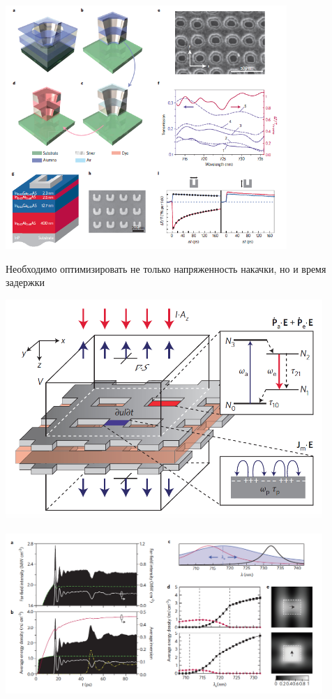 \documentclass[9pt, compress, xcolor=table]{beamer}
\begin{document}
\begin{frame}{}
\begin{center}
\includegraphics[width=0.8\textwidth]{am2}
\end{center}
Необходимо оптимизировать не только напряженность накачки, но и время задержки 

\end{frame}

\begin{frame}{}
\begin{center}
\includegraphics[width=0.9\textwidth]{am3}
\end{center}
\end{frame}

\begin{frame}{}
\begin{center}
\includegraphics[width=0.9\textwidth]{am4}
\end{center}
\end{frame}
\end{document}
